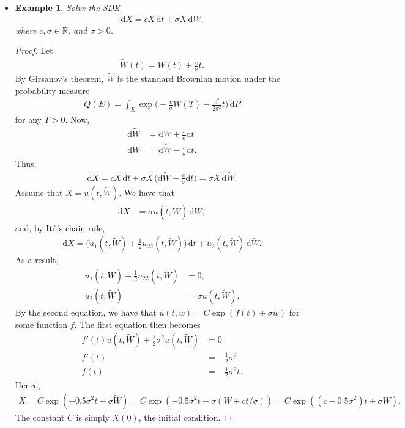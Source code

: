 \documentclass[10pt]{article}
\newtheorem{example}[lemma]{Example}
\newcommand{\dee}{\mathrm{d}}
\newcommand{\Real}{\mathbb{R}}
\begin{document}
\begin{itemize}
  \item \begin{example}
    Solve the SDE
    \begin{align*}
      \dee X = c X\, \dee t + \sigma X\, \dee W.
    \end{align*}
    where $c, \sigma \in \Real$, and $\sigma > 0$. 
  \end{example}
  \begin{proof}
    Let
    \begin{align*}
      \widetilde{W}(t) = W(t) + \frac{c}{\sigma} t.
    \end{align*}
    By Girsanov's theorem, $\widetilde{W}$ is the standard Brownian motion under the probability measure
    \begin{align*}
      Q(E) = \int_E \exp\bigg( -\frac{c}{\sigma} W(T) - \frac{c^2}{2\sigma^2} t \bigg)\, \dee P
    \end{align*}
    for any $T > 0$. Now,
    \begin{align*}
      \dee \widetilde{W} &= \dee W + \frac{c}{\sigma} \dee t \\
      \dee W &= \dee \widetilde{W} - \frac{c}{\sigma} \dee t.
    \end{align*}
    Thus,
    \begin{align*}
      \dee X = cX\, \dee t + \sigma X\, \bigg( \dee \widetilde{W} - \frac{c}{\sigma} \dee t \bigg) = \sigma X\, \dee \widetilde{W}.
    \end{align*}
    Assume that $X = u(t, \widetilde{W})$. We have that
    \begin{align*}
      \dee X &= \sigma u(t, \widetilde{W})\, \dee \widetilde{W},
    \end{align*}
    and, by It\^{o}'s chain rule,
    \begin{align*}
      \dee X = \bigg( u_1(t, \widetilde{W}) + \frac{1}{2} u_{22}(t, \widetilde{W}) \bigg)\, \dee t + u_2(t, \widetilde{W})\, \dee \widetilde{W}.
    \end{align*}
    As a result,
    \begin{align*}
      u_1(t, \widetilde{W}) + \frac{1}{2} u_{22}(t, \widetilde{W}) &= 0,\\
      u_2(t, \widetilde{W}) &= \sigma u(t, \widetilde{W}).
    \end{align*}
    By the second equation, we have that $u(t, w) = C \exp(f(t) + \sigma w)$ for some function $f$. The first equation then becomes
    \begin{align*}
      f'(t) u(t, \widetilde{W}) + \frac{1}{2}\sigma^2 u(t, \widetilde{W}) &= 0 \\
      f'(t) &= -\frac{1}{2}\sigma^2 \\
      f(t) &= -\frac{1}{2} \sigma^2 t.
    \end{align*}
    Hence,
    \begin{align*}
      X 
      = C \exp(-0.5\sigma^2 t + \sigma \widetilde{W})
      = C \exp(-0.5\sigma^2 t + \sigma (W + ct/\sigma) )
      = C \exp((c - 0.5\sigma^2 )t + \sigma W).
    \end{align*}
    The constant $C$ is simply $X(0)$, the initial condition.
  \end{proof}
\end{itemize}
\end{document}
